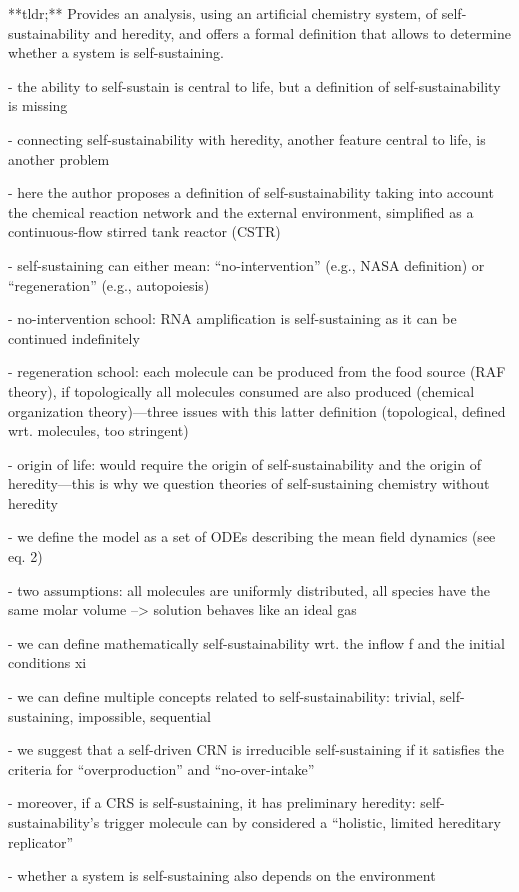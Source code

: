 \documentclass[11pt]{article}
\begin{document}
\begin{markdown}

**tldr;** Provides an analysis, using an artificial chemistry system, of self-sustainability and heredity, and offers a formal definition that allows to determine whether a system is self-sustaining.

- the ability to self-sustain is central to life, but a definition of self-sustainability is missing
    
- connecting self-sustainability with heredity, another feature central to life, is another problem
    
- here the author proposes a definition of self-sustainability taking into account the chemical reaction network and the external environment, simplified as a continuous-flow stirred tank reactor (CSTR)
    
- self-sustaining can either mean: “no-intervention” (e.g., NASA definition) or “regeneration” (e.g., autopoiesis)
    
- no-intervention school: RNA amplification is self-sustaining as it can be continued indefinitely
    
- regeneration school: each molecule can be produced from the food source (RAF theory), if topologically all molecules consumed are also produced (chemical organization theory)—three issues with this latter definition (topological, defined wrt. molecules, too stringent)
    
- origin of life: would require the origin of self-sustainability and the origin of heredity—this is why we question theories of self-sustaining chemistry without heredity
    
- we define the model as a set of ODEs describing the mean field dynamics (see eq. 2)
    
- two assumptions: all molecules are uniformly distributed, all species have the same molar volume --> solution behaves like an ideal gas
    
- we can define mathematically self-sustainability wrt. the inflow f and the initial conditions xi
    
- we can define multiple concepts related to self-sustainability: trivial, self-sustaining, impossible, sequential
    
- we suggest that a self-driven CRN is irreducible self-sustaining if it satisfies the criteria for “overproduction” and “no-over-intake”
    
- moreover, if a CRS is self-sustaining, it has preliminary heredity: self-sustainability’s trigger molecule can by considered a “holistic, limited hereditary replicator”
    
- whether a system is self-sustaining also depends on the environment
	
\end{markdown}
\end{document}
